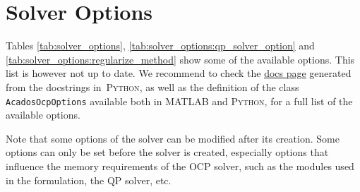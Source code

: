 \documentclass[english]{article}
\newcommand{\code}[1]{\texttt{#1}}
\newcommand{\matlab}{\textsc{MATLAB}}
\newcommand{\python}{\textsc{Python}}
\begin{document}
\section{Solver Options}\label{sec:solver}


Tables \ref{tab:solver_options}, \ref{tab:solver_options:qp_solver_option} and \ref{tab:solver_options:regularize_method} show some of the available options.
This list is however not up to date.
We recommend to check the \href{https://docs.acados.org/python_interface/index.html#acados_template.acados_ocp_options.AcadosOcpOptions}{docs page} generated from the docstrings in~\python, as well as the definition of the class \code{AcadosOcpOptions} available both in \matlab{} and \python{}, for a full list of the available options.


Note that some options of the solver can be modified after its creation. Some options can only be set before the solver is created, especially options that influence the memory requirements of the OCP solver, such as the modules used in the formulation, the QP solver, etc.
\end{document}

